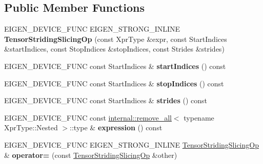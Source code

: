 \subsection*{Public Member Functions}
\begin{DoxyCompactItemize}
\item 
\mbox{\label{class_eigen_1_1_tensor_striding_slicing_op_ac836b4447e4fedf39e756dd9cefe8bdd}} 
E\+I\+G\+E\+N\+\_\+\+D\+E\+V\+I\+C\+E\+\_\+\+F\+U\+NC E\+I\+G\+E\+N\+\_\+\+S\+T\+R\+O\+N\+G\+\_\+\+I\+N\+L\+I\+NE {\bfseries Tensor\+Striding\+Slicing\+Op} (const Xpr\+Type \&expr, const Start\+Indices \&start\+Indices, const Stop\+Indices \&stop\+Indices, const Strides \&strides)
\item 
\mbox{\label{class_eigen_1_1_tensor_striding_slicing_op_a984d140ea7bf1909f7da9ae320aa2576}} 
E\+I\+G\+E\+N\+\_\+\+D\+E\+V\+I\+C\+E\+\_\+\+F\+U\+NC const Start\+Indices \& {\bfseries start\+Indices} () const
\item 
\mbox{\label{class_eigen_1_1_tensor_striding_slicing_op_a924cbb7e2e3082175d16ec2a94a149ce}} 
E\+I\+G\+E\+N\+\_\+\+D\+E\+V\+I\+C\+E\+\_\+\+F\+U\+NC const Start\+Indices \& {\bfseries stop\+Indices} () const
\item 
\mbox{\label{class_eigen_1_1_tensor_striding_slicing_op_a1559e33db3abc3b24b45def06a8954f5}} 
E\+I\+G\+E\+N\+\_\+\+D\+E\+V\+I\+C\+E\+\_\+\+F\+U\+NC const Start\+Indices \& {\bfseries strides} () const
\item 
\mbox{\label{class_eigen_1_1_tensor_striding_slicing_op_a0f55b9c6f1e5ba68a10c69dd5d3fb808}} 
E\+I\+G\+E\+N\+\_\+\+D\+E\+V\+I\+C\+E\+\_\+\+F\+U\+NC const \hyperlink{struct_eigen_1_1internal_1_1remove__all}{internal\+::remove\+\_\+all}$<$ typename Xpr\+Type\+::\+Nested $>$\+::type \& {\bfseries expression} () const
\item 
\mbox{\label{class_eigen_1_1_tensor_striding_slicing_op_a39d41bdf78c1031b8d714adb18bb5338}} 
E\+I\+G\+E\+N\+\_\+\+D\+E\+V\+I\+C\+E\+\_\+\+F\+U\+NC E\+I\+G\+E\+N\+\_\+\+S\+T\+R\+O\+N\+G\+\_\+\+I\+N\+L\+I\+NE \hyperlink{class_eigen_1_1_tensor_striding_slicing_op}{Tensor\+Striding\+Slicing\+Op} \& {\bfseries operator=} (const \hyperlink{class_eigen_1_1_tensor_striding_slicing_op}{Tensor\+Striding\+Slicing\+Op} \&other)

\end{DoxyCompactItemize}
